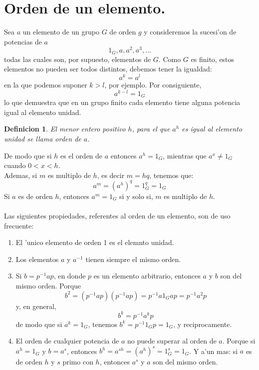 \documentclass[a4paper,openright,12pt]{report}
\numberwithin{equation}{section} %
\newtheorem{definicion}{Definicion}[section] %
\begin{document}
\section{Orden de un elemento.}
Sea $a$ un elemento de un grupo $G$ de orden $g$ y consideremos la sucesi'on de potencias de $a$
\[
1_{G},a,a^{2},a^{3},\ldots
\]
todas las cuales son, por supuesto, elementos de $G$. Como $G$ es finito, estos elementos no pueden ser todos distintos, debemos tener la igualdad:
\[
a^{k}=a^{l}
\]
en la que podemos suponer $k>l$, por ejemplo. Por consiguiente,
\[
a^{k-l}=1_{G}
\]
lo que demuestra que en un grupo finito cada elemento tiene alguna potencia igual al elemento unidad.
\begin{definicion}
El menor entero positivo $h$, para el que $a^{h}$ es igual al elemento unidad se llama orden de $a$.
\end{definicion}
De modo que si $h$ es el orden de $a$ entonces $a^{h}=1_{G}$, mientras que $a^{x}\neq
1_{G}$ cuando $0<x<h$.\\
Ademas, si $m$ es multiplo de $h$, es decir $m=hq$, tenemos que:
\[
a^{m}=(a^{h})^{q}=1_{G}^{q}=1_{G}
\]
Si $a$ es de orden $h$, entonces $a^{m}=1_{G}$ si y solo si, $m$ es multiplo de $h$.\\
\\
Las siguientes propiedades, referentes al orden de un elemento, son de uso frecuente:
\begin{enumerate}
\item El 'unico elemento de orden 1 es el elemnto unidad.
\item Los elementos $a$ y $a^{-1}$  tienen siempre el mismo orden.
\item Si $b=p^{-1}ap$, en donde $p$ es un elemento arbitrario, entonces $a$ y $b$ son del mismo orden. Porque 
\[
b^{2}=(p^{-1}ap)(p^{-1}ap)=p^{-1}a1_{G}ap=p^{-1}a^{2}p
\]
y, en general,
\[
b^{k}=p^{-1}a^{k}p
\]
de modo que si $a^{k}=1_{G}$, tenemos $b^{k}=p^{-1}1_{G}p=1_{G}$, y reciprocamente.
\item El orden de cualquier potencia de $a$ no puede superar al orden de $a$. Porque si $a^{h}=1_{G}$ y $b=a^{s}$, entonces $b^{h}=a^{sh}=(a^{h})^{s}=1_{G}^{s}=1_{G}$. Y a'un mas: si $a$ es de orden $h$ y $s$ primo con $h$, entonces $a^{s}$ y $a$ son del mismo orden.
\end{enumerate}
\end{document}
